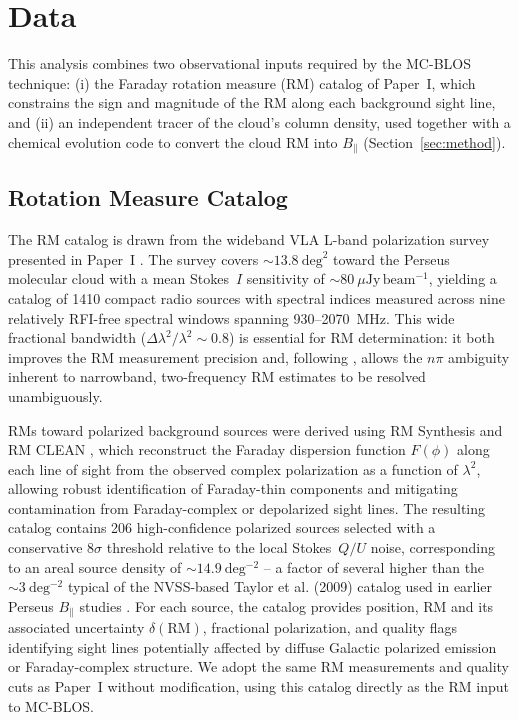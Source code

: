 \documentclass[twocolumn]{aastex631}
\begin{document}
\section{Data}
\label{sec:data}

This analysis combines two observational inputs required by the MC-BLOS technique: (i) the Faraday rotation measure (RM) catalog of Paper~I, which constrains the sign and magnitude of the RM along each background sight line, and (ii) an independent tracer of the cloud's column density, used together with a chemical evolution code to convert the cloud RM into $B_\parallel$ (Section~\ref{sec:method}).

\subsection{Rotation Measure Catalog}

The RM catalog is drawn from the wideband VLA L-band polarization survey presented in Paper~I \citep{hajizadeh2026comprehensive}. The survey covers $\sim13.8~\mathrm{deg}^2$ toward the Perseus molecular cloud with a mean Stokes~$I$ sensitivity of $\sim80~\mu\mathrm{Jy\,beam^{-1}}$, yielding a catalog of 1410 compact radio sources with spectral indices measured across nine relatively RFI-free spectral windows spanning 930--2070~MHz. This wide fractional bandwidth ($\Delta\lambda^2/\lambda^2 \sim 0.8$) is essential for RM determination: it both improves the RM measurement precision and, following \citet{brentjens2005}, allows the $n\pi$ ambiguity inherent to narrowband, two-frequency RM estimates to be resolved unambiguously.

RMs toward polarized background sources were derived using RM Synthesis \citep{burn1966, brentjens2005} and RM CLEAN \citep{heald2009}, which reconstruct the Faraday dispersion function $F(\phi)$ along each line of sight from the observed complex polarization as a function of $\lambda^2$, allowing robust identification of Faraday-thin components and mitigating contamination from Faraday-complex or depolarized sight lines. The resulting catalog contains 206 high-confidence polarized sources selected with a conservative $8\sigma$ threshold relative to the local Stokes~$Q/U$ noise, corresponding to an areal source density of $\sim14.9~\mathrm{deg^{-2}}$ -- a factor of several higher than the $\sim3~\mathrm{deg^{-2}}$ typical of the NVSS-based Taylor et al. (2009) catalog used in earlier Perseus $B_\parallel$ studies \citep{tahani2018}. For each source, the catalog provides position, RM and its associated uncertainty $\delta(\mathrm{RM})$, fractional polarization, and quality flags identifying sight lines potentially affected by diffuse Galactic polarized emission or Faraday-complex structure. We adopt the same RM measurements and quality cuts as Paper~I without modification, using this catalog directly as the RM input to MC-BLOS.
\end{document}
